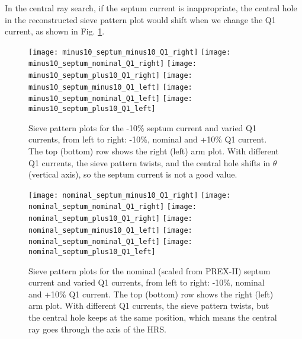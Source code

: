 In the central ray search, if the septum current is inappropriate, 
the central hole in the reconstructed sieve pattern plot would shift when we 
change the Q1 current, as shown in Fig. \ref{fig:central_ray_0}.
\begin{figure}[!h]
    \centering
    \texttt{[image: minus10\_septum\_minus10\_Q1\_right]}
    \texttt{[image: minus10\_septum\_nominal\_Q1\_right]}
    \texttt{[image: minus10\_septum\_plus10\_Q1\_right]}
    \texttt{[image: minus10\_septum\_minus10\_Q1\_left]}
    \texttt{[image: minus10\_septum\_nominal\_Q1\_left]}
    \texttt{[image: minus10\_septum\_plus10\_Q1\_left]}
    \caption[Sieve pattern plots for the -10\% septum current]
    {Sieve pattern plots for the -10\% septum current
    and varied Q1 currents, from left to right: -10\%, nominal and +10\% Q1 current.
    The top (bottom) row shows the right (left) arm plot.  With different Q1 currents, 
    the sieve pattern twists, and the central hole 
    shifts in $\theta$ (vertical axis), so the septum current is not a good value.}
    \label{fig:central_ray_0}
\end{figure}

\begin{figure}[!h]
    \centering
    \texttt{[image: nominal\_septum\_minus10\_Q1\_right]}
    \texttt{[image: nominal\_septum\_nominal\_Q1\_right]}
    \texttt{[image: nominal\_septum\_plus10\_Q1\_right]}
    \texttt{[image: nominal\_septum\_minus10\_Q1\_left]}
    \texttt{[image: nominal\_septum\_nominal\_Q1\_left]}
    \texttt{[image: nominal\_septum\_plus10\_Q1\_left]}
    \caption[Sieve pattern plots for the nominal (scaled from PREX-II)]
    {Sieve pattern plots for the nominal (scaled from PREX-II) 
    septum current and varied Q1 currents, from left to right: -10\%, nominal and +10\% Q1 current.
    The top (bottom) row shows the right (left) arm plot. With different Q1 currents,
    the sieve pattern twists, but the central hole keeps at the same position, 
    which means the central ray goes through the axis of the HRS.}
    \label{fig:central_ray_1}
\end{figure}

